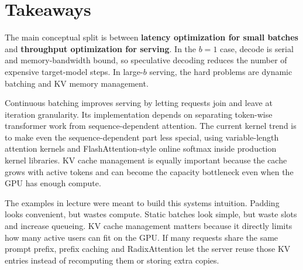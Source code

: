 \documentclass[11pt]{article}
\begin{document}
\section{Takeaways}

The main conceptual split is between \textbf{latency optimization for small batches} and \textbf{throughput optimization for serving}.  In the \(b=1\) case, decode is serial and memory-bandwidth bound, so speculative decoding reduces the number of expensive target-model steps.  In large-\(b\) serving, the hard problems are dynamic batching and KV memory management.

Continuous batching improves serving by letting requests join and leave at iteration granularity.  Its implementation depends on separating token-wise transformer work from sequence-dependent attention.  The current kernel trend is to make even the sequence-dependent part less special, using variable-length attention kernels and FlashAttention-style online softmax inside production kernel libraries.  KV cache management is equally important because the cache grows with active tokens and can become the capacity bottleneck even when the GPU has enough compute.

The examples in lecture were meant to build this systems intuition.  Padding looks convenient, but wastes compute.  Static batches look simple, but waste slots and increase queueing.  KV cache management matters because it directly limits how many active users can fit on the GPU.  If many requests share the same prompt prefix, prefix caching and RadixAttention let the server reuse those KV entries instead of recomputing them or storing extra copies.
\end{document}
